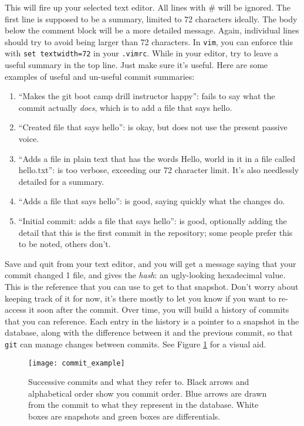 \par{
This will fire up your selected text editor. All lines with \# will be
ignored. The first line is supposed to be a summary, limited to 72 characters
ideally. The body below the comment block will be a more detailed message.
Again, individual lines should try to avoid being larger than 72 characters.
In \verb+vim+, you can enforce this with \verb+set textwidth=72+ in your
\verb+.vimrc+. While in your editor, try to leave a useful summary in the top
line. Just make sure it's useful. Here are some examples of useful and
un-useful commit summaries:
}

\begin{enumerate}
    \item ``Makes the git boot camp drill instructor happy'': fails to say
    what the commit actually \emph{does}, which is to add a file that says
    hello.
    \item ``Created file that says hello'': is okay, but does not use the
    present passive voice. 
    \item ``Adds a file in plain text that has the words Hello, world in it in
    a file called hello.txt'': is too verbose, exceeding our 72 character
    limit. It's also needlessly detailed for a summary.
    \item ``Adds a file that says hello'': is good, saying quickly what the
    changes do. 
    \item ``Initial commit: adds a file that says hello'': is good, optionally
    adding the detail that this is the first commit in the repository; some
    people prefer this to be noted, others don't. 
\end{enumerate}

\par{
Save and quit from your text editor, and you will get a message saying that
your commit changed 1 file, and gives the \emph{hash}: an ugly-looking
hexadecimal value. This is the reference that you can use to get to that
snapshot. Don't worry about keeping track of it for now, it's there mostly to
let you know if you want to re-access it soon after the commit. Over time, you
will build a history of commits that you can reference. Each entry in the
history is a pointer to a snapshot in the database, along with the difference
between it and the previous commit, so that \verb+git+ can manage changes
between commits. See Figure \ref{fig:commit_example} for a visual aid.
}

\begin{figure}
    \caption{
        Successive commits and what they refer to.
        Black arrows and alphabetical order show you commit order.
        Blue arrows are drawn from the commit to what they represent in the
        database. White boxes are snapshots and green boxes are differentials.
    }
    \label{fig:commit_example}
    \texttt{[image: commit\_example]}
\end{figure}


